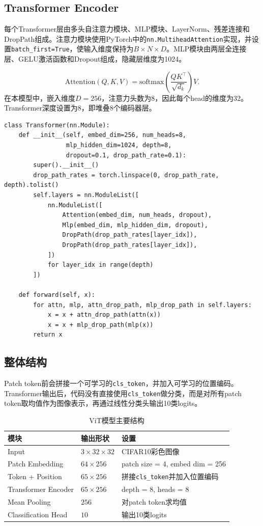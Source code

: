 \documentclass[11pt]{article}
\begin{document}
	\subsection{Transformer Encoder}
	每个Transformer层由多头自注意力模块、MLP模块、LayerNorm、残差连接和DropPath组成。注意力模块使用PyTorch中的\texttt{nn.MultiheadAttention}实现，并设置\texttt{batch\_first=True}，使输入维度保持为$B\times N\times D$。MLP模块由两层全连接层、GELU激活函数和Dropout组成，隐藏层维度为1024。

	\[
		\mathrm{Attention}(Q,K,V)=\mathrm{softmax}\left(\frac{QK^\top}{\sqrt{d_k}}\right)V.
	\]
	在本模型中，嵌入维度$D=256$，注意力头数为8，因此每个head的维度为32。Transformer深度设置为8，即堆叠8个编码器层。

	\begin{lstlisting}
class Transformer(nn.Module):
    def __init__(self, embed_dim=256, num_heads=8,
                 mlp_hidden_dim=1024, depth=8,
                 dropout=0.1, drop_path_rate=0.1):
        super().__init__()
        drop_path_rates = torch.linspace(0, drop_path_rate, depth).tolist()
        self.layers = nn.ModuleList([
            nn.ModuleList([
                Attention(embed_dim, num_heads, dropout),
                Mlp(embed_dim, mlp_hidden_dim, dropout),
                DropPath(drop_path_rates[layer_idx]),
                DropPath(drop_path_rates[layer_idx]),
            ])
            for layer_idx in range(depth)
        ])

    def forward(self, x):
        for attn, mlp, attn_drop_path, mlp_drop_path in self.layers:
            x = x + attn_drop_path(attn(x))
            x = x + mlp_drop_path(mlp(x))
        return x
	\end{lstlisting}

	\subsection{整体结构}
	Patch token前会拼接一个可学习的\texttt{cls\_token}，并加入可学习的位置编码。Transformer输出后，代码没有直接使用\texttt{cls\_token}做分类，而是对所有patch token取均值作为图像表示，再通过线性分类头输出10类logits。

	\begin{table}[H]
		\centering
		\caption{ViT模型主要结构}
		\begin{tabular}{M{3.8cm} M{4.2cm} M{5.5cm}}
			\toprule
			模块 & 输出形状 & 设置 \\
			\midrule
			Input & $3\times 32\times 32$ & CIFAR10彩色图像 \\
			Patch Embedding & $64\times 256$ & patch size = 4, embed dim = 256 \\
			Token + Position & $65\times 256$ & 拼接\texttt{cls\_token}并加入位置编码 \\
			Transformer Encoder & $65\times 256$ & depth = 8, heads = 8 \\
			Mean Pooling & $256$ & 对patch token求均值 \\
			Classification Head & $10$ & 输出10类logits \\
			\bottomrule
		\end{tabular}
	\end{table}
\end{document}
